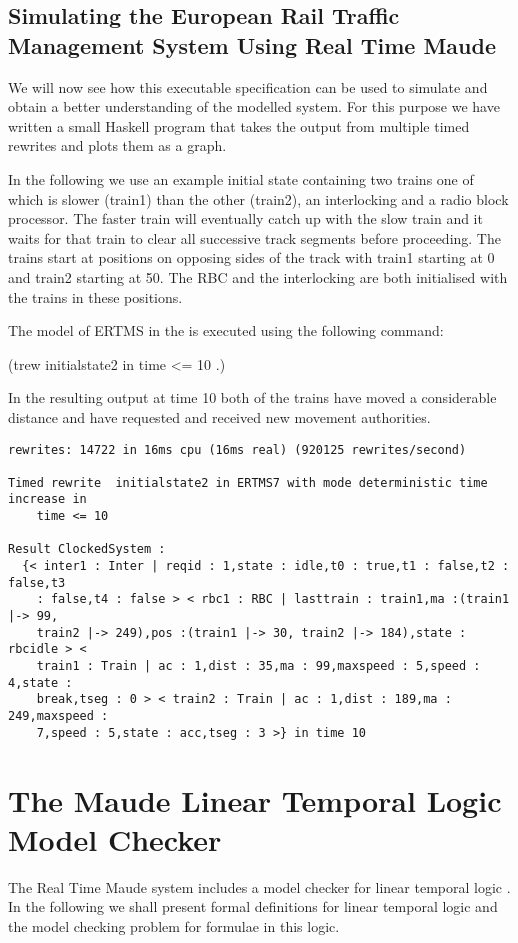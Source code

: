 \subsection{Simulating the European Rail Traffic Management System Using Real Time Maude}
We will now see how this executable specification can be used to simulate and obtain a better understanding of the modelled system. For this purpose we have written a small Haskell program that takes the output from multiple timed rewrites and plots them as a graph.

In the following we use an example initial state containing two trains one of which is slower (train1) than the other (train2), an interlocking and a radio block processor. The faster train will eventually catch up with the slow train and it waits for that train to clear all successive track segments before proceeding. The trains start at positions on opposing sides of the track with train1 starting at 0 and train2 starting at 50. The RBC and the interlocking are both initialised with the trains in these positions.

The model of ERTMS  in the  is executed using the following command:
\begin{center}
(trew initialstate2 in time <= 10 .)
\end{center}

In the resulting output at time 10 both of the trains have moved a considerable distance and have requested and received new movement authorities.
 
\begin{verbatim}
rewrites: 14722 in 16ms cpu (16ms real) (920125 rewrites/second)

Timed rewrite  initialstate2 in ERTMS7 with mode deterministic time increase in
    time <= 10

Result ClockedSystem :
  {< inter1 : Inter | reqid : 1,state : idle,t0 : true,t1 : false,t2 : false,t3
    : false,t4 : false > < rbc1 : RBC | lasttrain : train1,ma :(train1 |-> 99,
    train2 |-> 249),pos :(train1 |-> 30, train2 |-> 184),state : rbcidle > <
    train1 : Train | ac : 1,dist : 35,ma : 99,maxspeed : 5,speed : 4,state :
    break,tseg : 0 > < train2 : Train | ac : 1,dist : 189,ma : 249,maxspeed :
    7,speed : 5,state : acc,tseg : 3 >} in time 10
\end{verbatim}



\section{The Maude Linear Temporal Logic Model Checker}
The Real Time Maude system includes a model checker for linear temporal logic \cite{ES00}. In the following we shall present formal definitions for linear temporal logic and the model checking problem for formulae in this logic.

